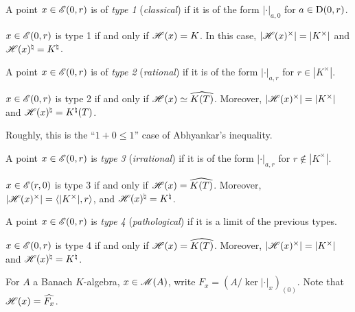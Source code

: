 A point $x\in \mathscr{E}(0,r)$ is of \emph{type 1} (\emph{classical}) if it is of the 
form $|\cdot|_{a,0}$ for $a\in \operatorname{D}(0,r)$. 

\begin{lemma}
$x\in \mathscr{E}(0,r)$ is type 1 if and only if $\mathscr{H}(x)=K$. In this case, 
$|\mathscr{H}(x)^\times| = |K^\times|$ and $\mathscr{H}(x)^\natural = K^\natural$. 
\end{lemma}

A point $x\in \mathscr{E}(0,r)$ is of \emph{type 2} (\emph{rational}) if it is of the 
form $|\cdot|_{a,r}$ for $r\in |K^\times|$. 

\begin{lemma}
$x\in \mathscr{E}(0,r)$ is type 2 if and only if $\mathscr{H}(x)\simeq \widehat{K(T)}$. 
Moreover, $|\mathscr{H}(x)^\times|=|K^\times|$ and $\mathscr{H}(x)^\natural = K^\natural(T)$. 
\end{lemma}

Roughly, this is the ``$1+0\leqslant 1$'' case of Abhyankar's inequality. 

A point $x\in \mathscr{E}(0,r)$ is \emph{type 3} (\emph{irrational}) if it is of the 
form $|\cdot|_{a,r}$ for $r\notin |K^\times|$. 

\begin{lemma}
$x\in \mathscr{E}(r,0)$ is type 3 if and only if $\mathscr{H}(x)= \widehat{K(T)}$. Moreover, 
$|\mathscr{H}(x)^\times|=\langle |K^\times|,r\rangle$, and 
$\mathscr{H}(x)^\natural = K^\natural$. 
\end{lemma}

A point $x\in \mathscr{E}(0,r)$ is \emph{type 4} (\emph{pathological}) if it is a 
limit of the previous types. 

\begin{lemma}
$x\in \mathscr{E}(0,r)$ is type 4 if and only if $\mathscr{H}(x)=\widehat{K(T)}$. Moreover, 
$|\mathscr{H}(x)^\times|=|K^\times|$ and $\mathscr{H}(x)^\natural = K^\natural$. 
\end{lemma}

For $A$ a Banach $K$-algebra, $x\in \operatorname{\mathscr{M}}(A)$, write 
$F_x=(A/\ker|\cdot|_x)_{(0)}$. Note that $\mathscr{H}(x)=\widehat{F_x}$. 

